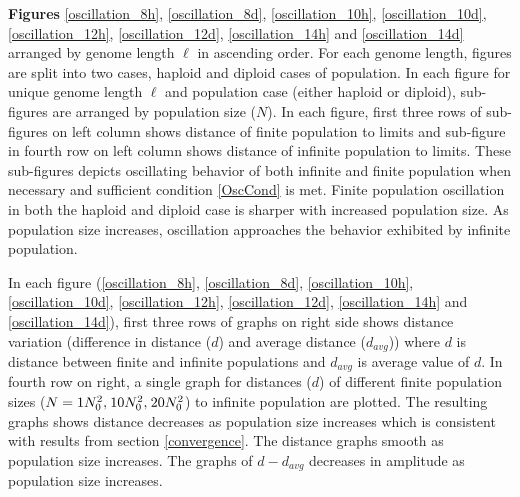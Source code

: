 

\textbf{ Figures} \ref{oscillation_8h}, \ref{oscillation_8d}, \ref{oscillation_10h}, \ref{oscillation_10d}, \ref{oscillation_12h}, \ref{oscillation_12d}, 
\ref{oscillation_14h} and \ref{oscillation_14d} arranged by genome length $\ell$ in ascending order. For each genome length, figures are split into two 
cases, haploid and diploid cases of population. In each figure for unique genome length $\ell$ and population case (either haploid or diploid), sub-figures 
are arranged by population size ($N$). In each figure, first three rows of sub-figures on left column shows distance of finite population 
to limits and sub-figure in fourth row on left column shows distance of infinite population to limits. These sub-figures depicts 
oscillating behavior of both infinite and finite population when necessary and sufficient condition \ref{OscCond} is met. 
Finite population oscillation in both the haploid and diploid case is sharper with increased population size. 
As population size increases, oscillation approaches the behavior exhibited by infinite population. 

In each figure (\ref{oscillation_8h}, \ref{oscillation_8d}, \ref{oscillation_10h}, \ref{oscillation_10d}, 
\ref{oscillation_12h}, \ref{oscillation_12d}, 
\ref{oscillation_14h} and \ref{oscillation_14d}), first three rows of graphs on right side shows 
distance variation (difference in distance ($d$) and average distance ($d_{avg}$))  
where $d$ is distance between finite and infinite populations and $d_{avg}$ is average value of $d$. 
In fourth row on right, a single graph for distances ($d$) of different finite population sizes 
($N = 1N_0^2, \hspace{0.01in}10N_0^2, \hspace{0.01in}20N_0^2$) to infinite population are plotted. The resulting graphs shows distance decreases 
as population size increases which is consistent with results from section \ref{convergence}. 
The distance graphs smooth as population size increases. The graphs of $d-d_{avg}$ decreases in amplitude as population size increases.

